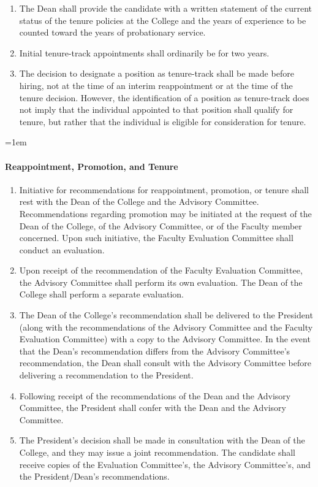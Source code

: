 \documentclass{manual}
\let\oldparagraph\paragraph
\renewcommand\paragraph{\leftskip=1em\oldparagraph}
\newcommand{\itemLevelA}{\alph*.}
\newcommand{\itemRefA}{\alph*}
\begin{document}
\begin{enumerate}[label=\itemLevelA,ref=\itemRefA]
\item The Dean shall provide the candidate with a written statement of the current status of the tenure policies at the College and the years of experience to be counted toward the years of probationary service.

\item Initial tenure-track appointments shall ordinarily be for two years.

\item The decision to designate a position as tenure-track shall be made before hiring, not at the time of an interim reappointment or at the time of the tenure decision. However, the identification of a position as tenure-track does not imply that the individual appointed to that position shall qualify for tenure, but rather that the individual is eligible for consideration for tenure.
\end{enumerate}

\paragraph{Reappointment, Promotion, and Tenure}
\begin{enumerate}[label=\itemLevelA,ref=\itemRefA]

\item Initiative for recommendations for reappointment, promotion, or tenure shall rest with the Dean of the College and the Advisory Committee. Recommendations regarding promotion may be initiated at the request of the Dean of the College, of the Advisory Committee, or of the Faculty member concerned. Upon such initiative, the Faculty Evaluation Committee shall conduct an evaluation.

\item Upon receipt of the recommendation of the Faculty Evaluation Committee, the Advisory Committee shall perform its own evaluation. The Dean of the College shall perform a separate evaluation.

\item The Dean of the College's recommendation shall be delivered to the President (along with the recommendations of the Advisory Committee and the Faculty Evaluation Committee) with a copy to the Advisory Committee. In the event that the Dean's recommendation differs from the Advisory Committee's recommendation, the Dean shall consult with the Advisory Committee before delivering a recommendation to the President.

\item Following receipt of the recommendations of the Dean and the Advisory Committee, the President shall confer with the Dean and the Advisory Committee.

\item The President's decision shall be made in consultation with the Dean of the College, and they may issue a joint recommendation. The candidate shall receive copies of the Evaluation Committee's, the Advisory Committee's, and the President/Dean's recommendations.
\end{enumerate}
\end{document}
